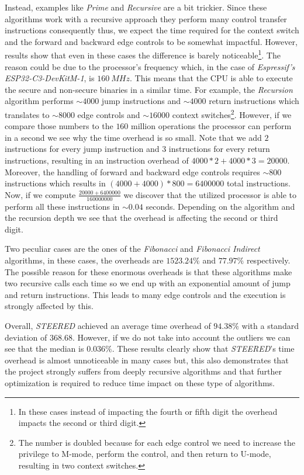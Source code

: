 Instead, examples like \textit{Prime} and \textit{Recursive} are a bit trickier.
Since these algorithms work with a recursive approach they perform many control transfer
instructions consequently thus, we expect the time required for the context
switch and the forward and backward edge controls to be somewhat impactful. However,
results show that even in these cases the difference is barely noticeable\footnote{In
these cases instead of impacting the fourth or fifth digit the overhead impacts
the second or third digit.}. The reason could be due to the processor's
frequency which, in the case of \textit{Espressif's ESP32-C3-DevKitM-1}, is $160
\ MHz$. This means that the CPU is able to execute the secure and non-secure
binaries in a similar time. For example, the \textit{Recursion} algorithm performs
$\sim 4000$ jump instructions and $\sim 4000$ return instructions which translates
to $\sim 8000$ edge controls and $\sim 16000$ context switches\footnote{The
number is doubled because for each edge control we need to increase the
privilege to M-mode, perform the control, and then return to U-mode, resulting in
two context switches.}. However, if we compare those numbers to the $160$
million operations the processor can perform in a second we see why the time
overhead is so small. Note that we add $2$ instructions for every jump instruction
and $3$ instructions for every return instructions, resulting in an instruction
overhead of $4000*2 + 4000*3 = 20000$. Moreover, the handling of forward and
backward edge controls requires $\sim 800$ instructions which results in
$(4000 + 4000) * 800 = 6400000$ total instructions. Now, if we compute
$\frac{20000 + 6400000}{160000000}$ we discover that the utilized processor is
able to perform all these instructions in $\sim 0.04$ seconds. Depending on the algorithm
and the recursion depth we see that the overhead is affecting the second or third
digit.

Two peculiar cases are the ones of the \textit{Fibonacci} and \textit{Fibonacci
Indirect} algorithms, in these cases, the overheads are $1523.24\%$ and $77.97\%$
respectively. The possible reason for these enormous overheads is that these
algorithms make two recursive calls each time so we end up with an exponential
amount of jump and return instructions. This leads to many edge controls and the
execution is strongly affected by this.

Overall, \textit{STEERED} achieved an average time overhead of $94.38\%$ with a standard
deviation of $368.68$. However, if we do not take into account the outliers we can
see that the median is $0.036\%$. These results clearly show that \textit{STEERED}'s
time overhead is almost unnoticeable in many cases but, this also demonstrates
that the project strongly suffers from deeply recursive algorithms and that
further optimization is required to reduce time impact on these type of
algorithms.

